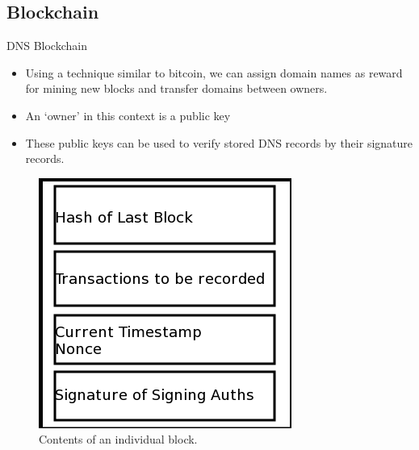 \documentclass[11pt]{beamer}
\begin{document}
\subsection{Blockchain}

\begin{frame}{DNS Blockchain}
	\begin{itemize}
		\item Using a technique similar to bitcoin, we can assign domain names as reward for mining new blocks and transfer domains between owners.
		
		\item An `owner' in this context is a public key
		
		\item These public keys can be used to verify stored DNS records by their signature records.
	\end{itemize}
\end{frame}




\begin{frame}
	\begin{figure}
	\centering
	\includegraphics[width=0.4\linewidth]{namecoin_block}
	\caption{Contents of an individual block.}
	\label{fig:blockchain}
	\end{figure}

\end{frame}
\end{document}
